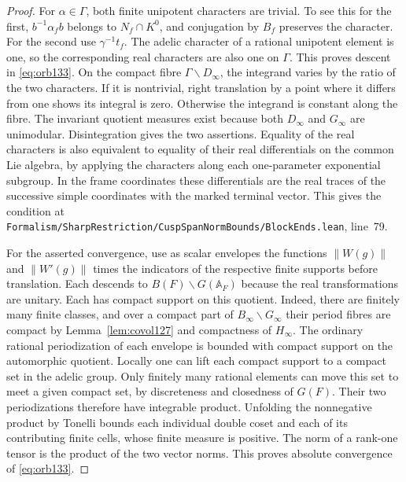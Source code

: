 \documentclass[a4paper,11pt]{article}
\theoremstyle{definition}
\theoremstyle{remark}
\newcommand{\srcloc}[2]{{\small\nolinkurl{#1.lean}}, line~#2}
\numberwithin{equation}{section}
\begin{document}
\begin{proof}
For \(\alpha\in\Gamma\), both finite unipotent characters are
trivial. To see this for the first, \(b^{-1}\alpha_f b\)
belongs to \(N_f\cap K^0\), and conjugation by \(B_f\) preserves
the character. For the second use \(\gamma^{-1}t_f\).
The adelic character of a rational unipotent element is one, so
the corresponding real characters are also one on \(\Gamma\).
This proves descent in \eqref{eq:orb133}.
On the compact fibre \(\Gamma\backslash D_\infty\), the
integrand varies by the ratio of the two characters. If it is
nontrivial, right translation by a point where it differs from
one shows its integral is zero. Otherwise the integrand is
constant along the fibre. The invariant quotient measures exist
because both \(D_\infty\) and \(G_\infty\) are unimodular.
Disintegration gives the two assertions. Equality of the real
characters is also equivalent to equality of their real
differentials on the common Lie algebra, by applying the
characters along each one-parameter exponential subgroup. In
the frame coordinates these differentials are the real traces
of the successive simple coordinates with the marked terminal
vector. This gives the condition at
\srcloc{Formalism/SharpRestriction/CuspSpanNormBounds/BlockEnds}{79}.

For the asserted convergence, use as scalar envelopes the
functions \(\|W(g)\|\) and \(\|W'(g)\|\) times the indicators of
the respective finite supports before translation. Each descends
to \(B(F)\backslash G(\mathbb A_F)\) because the real
transformations are unitary. Each has compact support on this
quotient. Indeed, there are finitely many finite classes, and
over a compact part of \(B_\infty\backslash G_\infty\) their
period fibres are compact by Lemma~\ref{lem:covol127} and
compactness of \(H_\infty\). The ordinary rational periodization
of each envelope is bounded with compact support on the
automorphic quotient. Locally one can lift each compact support
to a compact set in the adelic group. Only finitely many rational
elements can move this set to meet a given compact set, by
discreteness and closedness of \(G(F)\). Their two periodizations
therefore have integrable product. Unfolding the nonnegative
product by Tonelli bounds each individual double coset and each
of its contributing finite cells, whose finite measure is
positive. The norm of a rank-one tensor is the product of the
two vector norms. This proves absolute convergence of
\eqref{eq:orb133}.
\end{proof}
\end{document}
